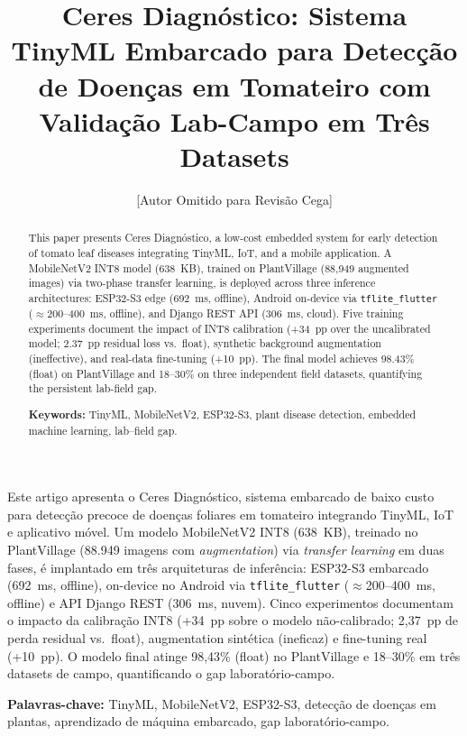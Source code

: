 \documentclass[12pt]{article}
\title{Ceres Diagnóstico: Sistema TinyML Embarcado para Detecção de
Doenças em Tomateiro com Validação Lab-Campo em Três Datasets}
\author{[Autor Omitido para Revisão Cega]\inst{1}}
\begin{document}
\maketitle

\begin{abstract}
This paper presents Ceres Diagnóstico, a low-cost embedded system for early
detection of tomato leaf diseases integrating TinyML, IoT, and a mobile application.
A MobileNetV2 INT8 model (638~KB), trained on PlantVillage (88{,}949 augmented
images) via two-phase transfer learning, is deployed across three inference
architectures:
ESP32-S3 edge (692~ms, offline), Android on-device via \texttt{tflite\_flutter}
($\approx$200--400~ms, offline), and Django REST API (306~ms, cloud). Five training
experiments document the impact of INT8 calibration (+34~pp over the uncalibrated
model; 2.37~pp residual loss vs.\ float), synthetic background augmentation
(ineffective), and real-data fine-tuning (+10~pp). The final model achieves 98.43\%
(float) on PlantVillage and 18--30\% on three independent field datasets,
quantifying the persistent lab-field gap.

\vspace{0.5em}\noindent\textbf{Keywords:} TinyML, MobileNetV2, ESP32-S3, plant
disease detection, embedded machine learning, lab--field gap.
\end{abstract}

\begin{resumo}
Este artigo apresenta o Ceres Diagnóstico, sistema embarcado de baixo custo para
detecção precoce de doenças foliares em tomateiro integrando TinyML, IoT e
aplicativo móvel. Um modelo MobileNetV2 INT8 (638~KB), treinado no PlantVillage
(88.949 imagens com \textit{augmentation}) via \textit{transfer learning} em duas
fases, é implantado em três arquiteturas de inferência: ESP32-S3 embarcado
(692~ms, offline), on-device no
Android via \texttt{tflite\_flutter} ($\approx$200--400~ms, offline) e API Django
REST (306~ms, nuvem). Cinco experimentos documentam o impacto da calibração INT8
(+34~pp sobre o modelo não-calibrado; 2,37~pp de perda residual vs.\ float),
augmentation sintética (ineficaz) e fine-tuning real (+10~pp). O modelo final atinge
98,43\% (float) no PlantVillage e 18--30\% em três datasets de campo,
quantificando o gap laboratório-campo.

\vspace{0.5em}\noindent\textbf{Palavras-chave:} TinyML, MobileNetV2, ESP32-S3,
detecção de doenças em plantas, aprendizado de máquina embarcado, gap
laboratório-campo.
\end{resumo}
\end{document}
